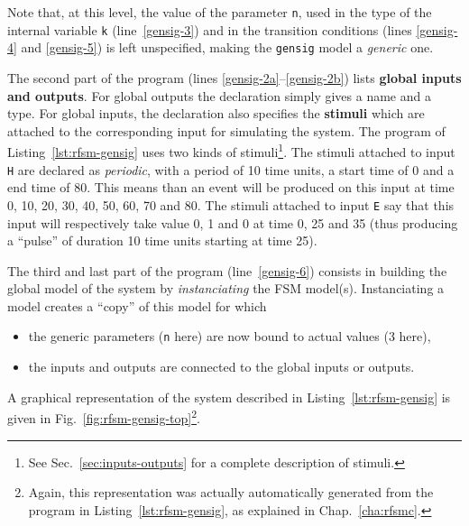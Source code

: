 Note that, at this level, the value of the parameter \verb|n|, used in the type of the internal
variable \verb|k| (line~\ref{gensig-3}) and in the transition conditions (lines \ref{gensig-4} and
\ref{gensig-5}) is left unspecified, making the \verb|gensig| model a \emph{generic} one.

\medskip The second part of the program (lines \ref{gensig-2a}--\ref{gensig-2b}) lists \textbf{global inputs and
  outputs}.
For global outputs the
declaration simply gives a name and a type.  For global inputs, the declaration also specifies the
\textbf{stimuli} which are attached to the corresponding input for simulating the system. The
program of Listing~\ref{lst:rfsm-gensig} uses two kinds of stimuli\footnote{See
  Sec.~\ref{sec:inputs-outputs} for a complete description of stimuli.}. The stimuli attached to input
\verb|H| are declared as \emph{periodic}, with a period of 10 time units, a start time of 0 and a
end time of 80. This means than an event will be produced on this input at time 0, 10, 20, 30, 40,
50, 60, 70 and 80. The stimuli attached to input \verb|E| say that this input will respectively take
value 0, 1 and 0 at time 0, 25 and 35 (thus producing a ``pulse'' of duration 10 time units starting
at time 25).

\medskip
The third and last part of the program (line~\ref{gensig-6}) consists in building the global model of the system by
\emph{instanciating} the FSM model(s).
Instanciating a model creates a ``copy'' of this model for which
\begin{itemize}
\item the generic parameters (\verb|n| here) are now bound to actual values (3 here),
\item the inputs and outputs are connected to the global inputs or outputs. 
\end{itemize}

\medskip
A graphical representation of the system described in Listing~\ref{lst:rfsm-gensig} is given in
Fig.~\ref{fig:rfsm-gensig-top}\footnote{Again, this representation was actually automatically generated from the
program in Listing~\ref{lst:rfsm-gensig}, as explained in Chap.~\ref{cha:rfsmc}.}. 

